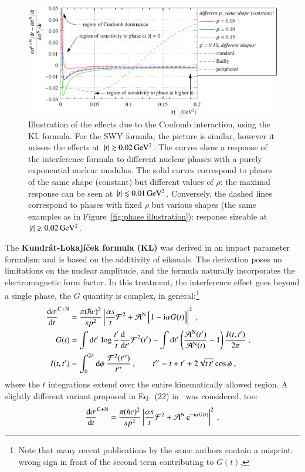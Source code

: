 \begin{figure}
\begin{center}
\includegraphics{fig/cni_effect_illustration.pdf}
\caption{%
Illustration of the effects due to the Coulomb interaction, using the KL formula. For the SWY formula, the picture is similar, however it misses the effects at $|t| \gtrsim 0.02\,{\rm GeV^2}$. The curves show a response of the interference formula to different nuclear phases with a purely exponential nuclear modulus. The solid curves correspond to phases of the same shape (constant) but different values of $\rho$: the maximal response can be seen at $|t| \lesssim 0.01\,{\rm GeV^2}$. Conversely, the dashed lines correspond to phases with fixed $\rho$ but various shapes (the same examples as in Figure~\ref{fig:phase illustration}): response sizeable at $|t| \gtrsim 0.02\,{\rm GeV^2}$.
}
\label{fig:cni effect}
\end{center}
\end{figure}

The {\bf Kundr\' at-Lokaj\' i\v cek formula (KL)} \cite{kl94} was derived in an impact parameter formalism and is based on the additivity of eikonals. The derivation poses no limitations on the nuclear amplitude, and the formula naturally incorporates the electromagnetic form factor. In this treatment, the interference effect goes beyond a single phase, the $G$ quantity is complex, in general:\footnote{%
Note that many recent publications by the same authors contain a misprint: wrong sign in front of the second term contributing to $G(t)$.
}
\begin{equation}
\label{eq:int kl}
	\begin{aligned}
		{\d\sigma\over \d t}^{\rm C+N} &= {\pi (\hbar c)^2 \over s p^2} \left | {\alpha s\over t} {\cal F}^2
			+ {\cal A}^{\rm N}\, \Big[1 - \I\alpha G(t)\Big] \right |^2\ ,\cr
		G(t) &= 
			\int \d t'\, \log {t'\over t} {\d\phantom{t'}\over \d t'} {\cal F}^2(t')
			- \int \d t' \left( {{\cal A}^{\rm N}(t') \over {\cal A}^{\rm N}(t)} - 1 \right) { I(t, t')\over 2\pi }
			\ ,\cr
		I(t, t') &= \int_0^{2\pi} \d\phi\ {{\cal F}^2(t'')\over t''}\ ,\qquad t'' = t + t' + 2\sqrt{t\, t'} \cos\phi\ ,\cr
	\end{aligned}
\end{equation}
where the $t$ integrations extend over the entire kinematically allowed region. A slightly different variant proposed in Eq.~(22) in~\cite{kl05} was considered, too:
\begin{equation}
\label{eq:int kl exp}
	{\d\sigma\over \d t}^{\rm C+N} = {\pi (\hbar c)^2 \over s p^2} \left | {\alpha s\over t} {\cal F}^2
		+ {\cal A}^{\rm N}\, \e^{- \I\alpha G(t)} \right |^2 \ .
\end{equation}

